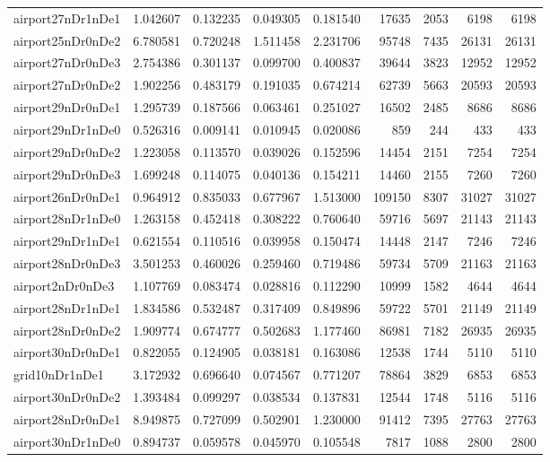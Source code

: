 \begin{longtable}{|l|r|r|r|r|r|r|r|r|}
airport27nDr1nDe1 & 1.042607 & 0.132235 & 0.049305 & 0.181540 & 17635 & 2053 & 6198 & 6198 \\
airport25nDr0nDe2 & 6.780581 & 0.720248 & 1.511458 & 2.231706 & 95748 & 7435 & 26131 & 26131 \\
airport27nDr0nDe3 & 2.754386 & 0.301137 & 0.099700 & 0.400837 & 39644 & 3823 & 12952 & 12952 \\
airport27nDr0nDe2 & 1.902256 & 0.483179 & 0.191035 & 0.674214 & 62739 & 5663 & 20593 & 20593 \\
airport29nDr0nDe1 & 1.295739 & 0.187566 & 0.063461 & 0.251027 & 16502 & 2485 & 8686 & 8686 \\
airport29nDr1nDe0 & 0.526316 & 0.009141 & 0.010945 & 0.020086 & 859 & 244 & 433 & 433 \\
airport29nDr0nDe2 & 1.223058 & 0.113570 & 0.039026 & 0.152596 & 14454 & 2151 & 7254 & 7254 \\
airport29nDr0nDe3 & 1.699248 & 0.114075 & 0.040136 & 0.154211 & 14460 & 2155 & 7260 & 7260 \\
airport26nDr0nDe1 & 0.964912 & 0.835033 & 0.677967 & 1.513000 & 109150 & 8307 & 31027 & 31027 \\
airport28nDr1nDe0 & 1.263158 & 0.452418 & 0.308222 & 0.760640 & 59716 & 5697 & 21143 & 21143 \\
airport29nDr1nDe1 & 0.621554 & 0.110516 & 0.039958 & 0.150474 & 14448 & 2147 & 7246 & 7246 \\
airport28nDr0nDe3 & 3.501253 & 0.460026 & 0.259460 & 0.719486 & 59734 & 5709 & 21163 & 21163 \\
airport2nDr0nDe3 & 1.107769 & 0.083474 & 0.028816 & 0.112290 & 10999 & 1582 & 4644 & 4644 \\
airport28nDr1nDe1 & 1.834586 & 0.532487 & 0.317409 & 0.849896 & 59722 & 5701 & 21149 & 21149 \\
airport28nDr0nDe2 & 1.909774 & 0.674777 & 0.502683 & 1.177460 & 86981 & 7182 & 26935 & 26935 \\
airport30nDr0nDe1 & 0.822055 & 0.124905 & 0.038181 & 0.163086 & 12538 & 1744 & 5110 & 5110 \\
grid10nDr1nDe1 & 3.172932 & 0.696640 & 0.074567 & 0.771207 & 78864 & 3829 & 6853 & 6853 \\
airport30nDr0nDe2 & 1.393484 & 0.099297 & 0.038534 & 0.137831 & 12544 & 1748 & 5116 & 5116 \\
airport28nDr0nDe1 & 8.949875 & 0.727099 & 0.502901 & 1.230000 & 91412 & 7395 & 27763 & 27763 \\
airport30nDr1nDe0 & 0.894737 & 0.059578 & 0.045970 & 0.105548 & 7817 & 1088 & 2800 & 2800 \\

\end{longtable}
